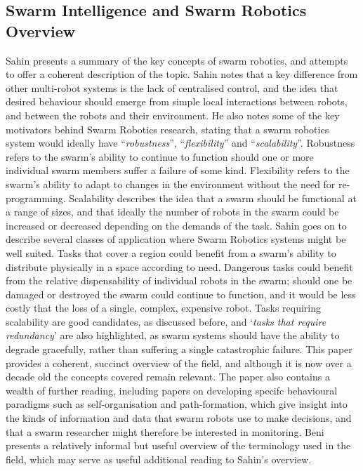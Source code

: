\documentclass[titlepage,hidelinks,10pt]{article}
\begin{document}
\subsection{Swarm Intelligence and Swarm Robotics Overview} \label{GeneralSR}
Sahin\cite{InspirationToApplication} presents a summary of the key concepts of swarm robotics, and attempts to offer a coherent description of the topic. Sahin notes that a key difference from other multi-robot systems is the lack of centralised control, and the idea that desired behaviour should emerge from simple local interactions between robots, and between the robots and their environment. He also notes some of the key motivators behind Swarm Robotics research, stating that a swarm robotics system would ideally have ``\textit{robustness}'', ``\textit{flexibility}'' and ``\textit{scalability}''. Robustness refers to the swarm's ability to continue to function should one or more individual swarm members suffer a failure of some kind. Flexibility refers to the swarm's ability to adapt to changes in the environment without the need for re-programming. Scalability describes the idea that a swarm should be functional at a range of sizes, and that ideally the number of robots in the swarm could be increased or decreased depending on the demands of the task. Sahin\cite{InspirationToApplication} goes on to describe several classes of application where Swarm Robotics systems might be well suited. Tasks that cover a region could benefit from a swarm's ability to distribute physically in a space according to need. Dangerous tasks could benefit from the relative dispensability of individual robots in the swarm; should one be damaged or destroyed the swarm could continue to function, and it would be less costly that the loss of a single, complex, expensive robot. Tasks requiring scalability are good candidates, as discussed before, and `\textit{tasks that require redundancy}' are also highlighted, as swarm systems should have the ability to degrade gracefully, rather than suffering a single catastrophic failure. This paper\cite{InspirationToApplication} provides a coherent, succinct overview of the field, and although it is now over a decade old the concepts covered remain relevant. The paper also contains a wealth of further reading, including papers on developing specifc behavioural paradigms such as self-organisation\cite{SelfOrganizing} and path-formation\cite{PathFormation}, which give insight into the kinds of information and data that swarm robots use to make decisions, and that a swarm researcher might therefore be interested in monitoring. Beni\cite{FromSIToSR} presents a relatively informal but useful overview of the terminology used in the field, which may serve as useful additional reading to Sahin's overview.
\end{document}

